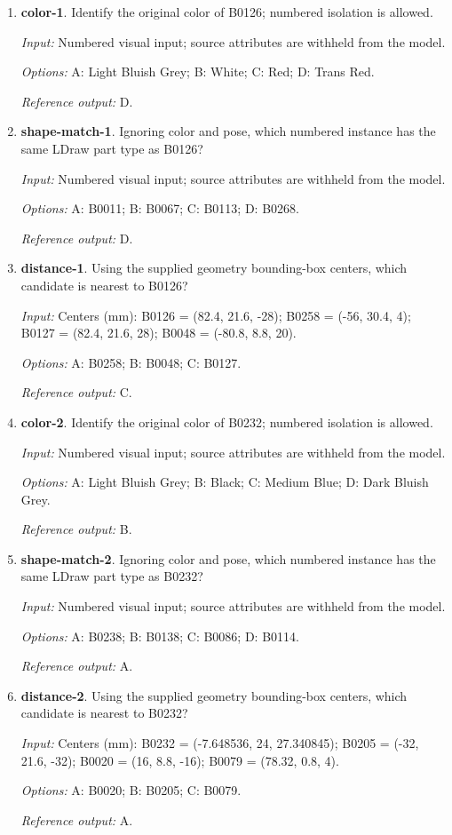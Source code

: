 \begin{enumerate}
\item \textbf{color-1}. Identify the original color of B0126; numbered isolation is allowed.\par {\small \textit{Input:} Numbered visual input; source attributes are withheld from the model. \par\textit{Options:} A: Light Bluish Grey; B: White; C: Red; D: Trans Red. \par\textit{Reference output:} D.}
\item \textbf{shape-match-1}. Ignoring color and pose, which numbered instance has the same LDraw part type as B0126?\par {\small \textit{Input:} Numbered visual input; source attributes are withheld from the model. \par\textit{Options:} A: B0011; B: B0067; C: B0113; D: B0268. \par\textit{Reference output:} D.}
\item \textbf{distance-1}. Using the supplied geometry bounding-box centers, which candidate is nearest to B0126?\par {\small \textit{Input:} Centers (mm): B0126 = (82.4, 21.6, -28); B0258 = (-56, 30.4, 4); B0127 = (82.4, 21.6, 28); B0048 = (-80.8, 8.8, 20). \par\textit{Options:} A: B0258; B: B0048; C: B0127. \par\textit{Reference output:} C.}
\item \textbf{color-2}. Identify the original color of B0232; numbered isolation is allowed.\par {\small \textit{Input:} Numbered visual input; source attributes are withheld from the model. \par\textit{Options:} A: Light Bluish Grey; B: Black; C: Medium Blue; D: Dark Bluish Grey. \par\textit{Reference output:} B.}
\item \textbf{shape-match-2}. Ignoring color and pose, which numbered instance has the same LDraw part type as B0232?\par {\small \textit{Input:} Numbered visual input; source attributes are withheld from the model. \par\textit{Options:} A: B0238; B: B0138; C: B0086; D: B0114. \par\textit{Reference output:} A.}
\item \textbf{distance-2}. Using the supplied geometry bounding-box centers, which candidate is nearest to B0232?\par {\small \textit{Input:} Centers (mm): B0232 = (-7.648536, 24, 27.340845); B0205 = (-32, 21.6, -32); B0020 = (16, 8.8, -16); B0079 = (78.32, 0.8, 4). \par\textit{Options:} A: B0020; B: B0205; C: B0079. \par\textit{Reference output:} A.}

\end{enumerate}
